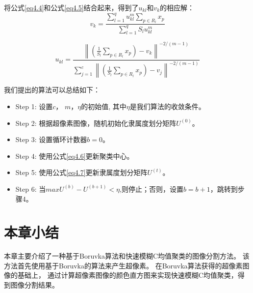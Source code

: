 将公式\ref{eq4.4}和公式\ref{eq4.5}结合起来，得到了$u_{kl}$和$v_k$的相应解：
\begin{equation}
v_{k} = \frac{\sum_{l=1}^{q} u_{kl}^{m} \sum_{p\in R_{l}} x_{p}}{\sum_{l=1}^{q} S_{l} u_{kl}^{m}}
\label{eq4.6}
\end{equation}

\begin{equation}
u_{kl} = \frac{ \left \| (\frac{1}{S_{l}}\sum_{p\in R_{l}}x_{p})-v_{k} \right \|^{-2/(m-1)} }
{ \sum_{j=1}^{c} \left \| (\frac{1}{S_{l}}\sum_{p\in R_{l}}x_{p})-v_{j} \right \|^{-2/(m-1)}}
\label{eq4.7}
\end{equation}

我们提出的算法可以总结如下：
\begin{itemize}
\item Step 1: 设置$c$， $m$，$\eta$的初始值, 其中$\eta$是我们算法的收敛条件。
\item Step 2: 根据超像素图像，随机初始化隶属度划分矩阵$U^{(0)}$。
\item Step 3: 设置循环计数器$b = 0$。
\item Step 4: 使用公式\ref{eq4.6}更新聚类中心。
\item Step 5: 使用公式\ref{eq4.7}更新隶属度划分矩阵$U^{(t)}$。
\item Step 6: 当$max{U^{(b)}-U^{(b+1)}}<\eta$,则停止；否则，设置$b=b+1$，跳转到步骤4。
\end{itemize}

\section{本章小结}

本章主要介绍了一种基于Boruvka算法和快速模糊C均值聚类的图像分割方法。
该方法首先使用基于Boruvka的算法来产生超像素。
在Boruvka算法获得的超像素图像的基础上，
通过计算超像素图像的颜色直方图来实现快速模糊C均值聚类，得到图像分割结果。